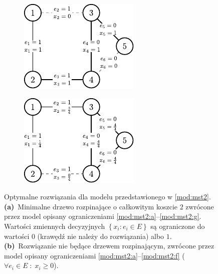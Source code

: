 \begin{figure}[!htbp]
	\null\hfill
	\begin{subfigure}[b]{0.4\textwidth}
		\includegraphics[width=\textwidth]{Chapter_III/MST3-example/a}
		\caption{}
		\label{fig:mst3Example:a}
	\end{subfigure}
	\hfill
	\begin{subfigure}[b]{0.4\textwidth}
		\includegraphics[width=\textwidth]{Chapter_III/MST3-example/b}
		\caption{}
		\label{fig:mst3Example:b}
	\end{subfigure}
	\hfill\null
	\caption{
		Optymalne rozwiązania dla modelu przedstawionego w \ref{mod:mst2}.
		\textbf{(a)}~Minimalne drzewo rozpinające o całkowitym koszcie $2$ zwrócone przez model opisany ograniczeniami \ref{mod:mst2:a}--\ref{mod:mst2:g}. Wartości zmiennych decyzyjnych $\left\{ x_{i} : e_{i} \in E \right\}$ są ograniczone do wartości $0$ (krawędź nie należy do rozwiązania) albo $1$.
		\textbf{(b)}~Rozwiązanie nie będące drzewem rozpinającym, zwrócone przez model opisany ograniczeniami \ref{mod:mst2:a}--\ref{mod:mst2:f} ($\forall e_{i} \in E \; : \; x_{i} \geqslant 0$).
	}
	\label{fig:mst3Example}
\end{figure}

